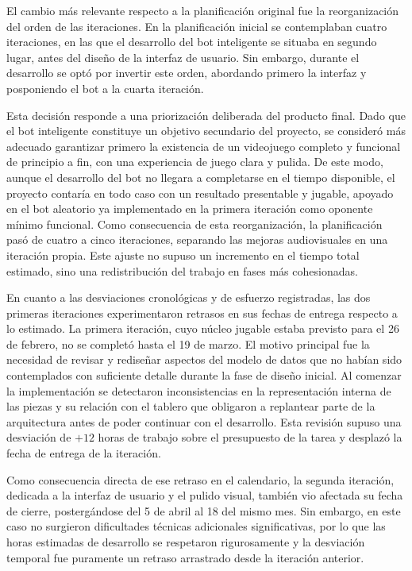 El cambio más relevante respecto a la planificación original fue la reorganización del orden de las iteraciones. En la planificación inicial se contemplaban cuatro iteraciones, en las que el desarrollo del bot inteligente se situaba en segundo lugar, antes del diseño de la interfaz de usuario. Sin embargo, durante el desarrollo se optó por invertir este orden, abordando primero la interfaz y posponiendo el bot a la cuarta iteración.

Esta decisión responde a una priorización deliberada del producto final. Dado que el bot inteligente constituye un objetivo secundario del proyecto, se consideró más adecuado garantizar primero la existencia de un videojuego completo y funcional de principio a fin, con una experiencia de juego clara y pulida. De este modo, aunque el desarrollo del bot no llegara a completarse en el tiempo disponible, el proyecto contaría en todo caso con un resultado presentable y jugable, apoyado en el bot aleatorio ya implementado en la primera iteración como oponente mínimo funcional. Como consecuencia de esta reorganización, la planificación pasó de cuatro a cinco iteraciones, separando las mejoras audiovisuales en una iteración propia. Este ajuste no supuso un incremento en el tiempo total estimado, sino una redistribución del trabajo en fases más cohesionadas.

\clearpage

En cuanto a las desviaciones cronológicas y de esfuerzo registradas, las dos primeras iteraciones experimentaron retrasos en sus fechas de entrega respecto a lo estimado. La primera iteración, cuyo núcleo jugable estaba previsto para el 26 de febrero, no se completó hasta el 19 de marzo. El motivo principal fue la necesidad de revisar y rediseñar aspectos del modelo de datos que no habían sido contemplados con suficiente detalle durante la fase de diseño inicial. Al comenzar la implementación se detectaron inconsistencias en la representación interna de las piezas y su relación con el tablero que obligaron a replantear parte de la arquitectura antes de poder continuar con el desarrollo. Esta revisión supuso una desviación de $+12$ horas de trabajo sobre el presupuesto de la tarea y desplazó la fecha de entrega de la iteración.

Como consecuencia directa de ese retraso en el calendario, la segunda iteración, dedicada a la interfaz de usuario y el pulido visual, también vio afectada su fecha de cierre, postergándose del 5 de abril al 18 del mismo mes. Sin embargo, en este caso no surgieron dificultades técnicas adicionales significativas, por lo que las horas estimadas de desarrollo se respetaron rigurosamente y la desviación temporal fue puramente un retraso arrastrado desde la iteración anterior.

